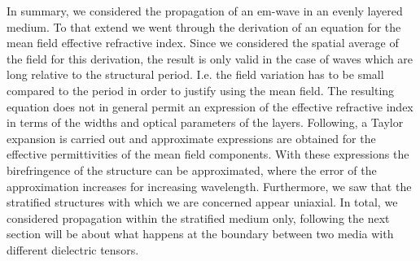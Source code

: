 In summary, we considered the propagation of an em-wave in an evenly layered medium. To that extend we went through the derivation of an equation for the mean field effective refractive index. Since we considered the spatial average of the field for this derivation, the result is only valid in the case of waves which are long relative to the structural period. I.e. the field variation has to be small compared to the period in order to justify using the mean field. The resulting equation does not in general permit an expression of the effective refractive index in terms of the widths and optical parameters of the layers. Following, a Taylor expansion is carried out and approximate expressions are obtained for the effective permittivities of the mean field components. With these expressions the birefringence of the structure can be approximated, where the error of the approximation increases for increasing wavelength. Furthermore, we saw that the stratified structures with which we are concerned appear uniaxial. In total, we considered propagation within the stratified medium only, following the next section will be about what happens at the boundary between two media with different dielectric tensors.

